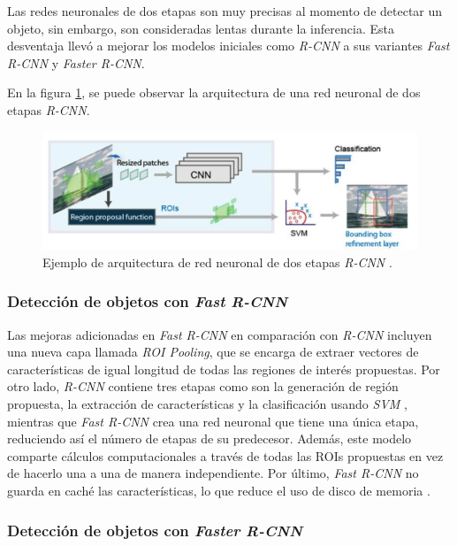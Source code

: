 Las redes neuronales de dos etapas son muy precisas al momento de detectar un objeto, sin embargo, son consideradas lentas durante la inferencia. Esta desventaja llevó a mejorar los modelos iniciales como \textit{R-CNN} a sus variantes \textit{Fast R-CNN} y \textit{Faster R-CNN}.

En la figura \ref{fig:rcnn}, se puede observar la arquitectura de una red neuronal de dos etapas \textit{R-CNN}.

\begin{figure}[ht]
	\centering
	\includegraphics[scale=.25]{./Figures/R-CNN.png}
	\caption{Ejemplo de arquitectura de red neuronal de dos etapas \textit{R-CNN} \cite{WEBSITE:6}.}
	\label{fig:rcnn}
\end{figure}

\subsubsection{Detección de objetos con \textit{Fast R-CNN}}

Las mejoras adicionadas en \textit{Fast R-CNN} en comparación con \textit{R-CNN} incluyen una nueva capa llamada \textit{ROI Pooling}, que se encarga de extraer vectores de características de igual longitud de todas las regiones de interés propuestas. Por otro lado, \textit{R-CNN} contiene tres etapas como son la generación de región propuesta, la extracción de características y la clasificación usando \textit{SVM} \cite{ARTICLE:19}, mientras que \textit{Fast R-CNN} crea una red neuronal que tiene una única etapa, reduciendo así el número de etapas de su predecesor. Además, este modelo comparte cálculos computacionales a través de todas las ROIs propuestas en vez de hacerlo una a una de manera independiente. Por último, \textit{Fast R-CNN} no guarda en caché las características, lo que reduce el uso de disco de memoria \cite{ARTICLE:10}.

\subsubsection{Detección de objetos con \textit{Faster R-CNN}}

